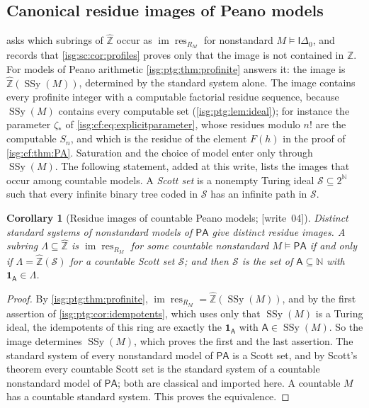 \documentclass[11pt]{article}
\newtheorem{corollary}[corollary]{Corollary}
\theoremstyle{definition}
\theoremstyle{remark}
\newcommand{\Z}{\mathbb{Z}}
\newcommand{\N}{\mathbb{N}}
\newcommand{\Zhat}{\widehat{\Z}}
\newcommand{\res}{\operatorname{res}}
\newcommand{\Idelta}{\mathsf{I}\Delta_0}
\newcommand{\im}{\operatorname{im}}
\newcommand{\PA}{\mathsf{PA}}
\newcommand{\SSy}{\operatorname{SSy}}
\begin{document}
\subsection{Canonical residue images of Peano models}\label{isg:ptg:sec:images}
 asks which subrings of $\Zhat$ occur as
$\im\res_{R_M}$ for nonstandard $M\models\Idelta$, and records that
\cref{isg:sc:cor:profiles} proves only that the image is not contained in
$\Z$. For models of Peano arithmetic \cref{isg:ptg:thm:profinite} answers
it: the image is $\Zhat(\SSy(M))$, determined by the standard system alone.
The image contains every profinite integer with a computable factorial
residue sequence, because $\SSy(M)$ contains every computable set
(\cref{isg:ptg:lem:ideal}); for instance the parameter $\zeta_*$ of
\eqref{isg:cf:eq:explicitparameter}, whose residues modulo $n!$ are the
computable $S_n$, and which is the residue of the element $F(h)$ in the
proof of \cref{isg:cf:thm:PA}. Saturation
and the choice of model enter only through $\SSy(M)$. The following
statement, added at this write, lists the images that occur among countable
models. A \emph{Scott set} is a nonempty Turing ideal
$\mathcal S\subseteq2^\N$ such that every infinite binary tree coded in
$\mathcal S$ has an infinite path in $\mathcal S$.

\begin{corollary}[Residue images of countable Peano models; \textup{[write~04]}]\label{isg:ptg:cor:images}
Distinct standard systems of nonstandard models of $\PA$ give distinct
residue images. A subring $\Lambda\subseteq\Zhat$ is $\im\res_{R_M}$ for
some countable nonstandard $M\models\PA$ if and only if
$\Lambda=\Zhat(\mathcal S)$ for a countable Scott set $\mathcal S$; and then
$\mathcal S$ is the set of $\mathsf A\subseteq\N$ with
$\mathbf 1_{\mathsf A}\in\Lambda$.
\end{corollary}
\begin{proof}
By \cref{isg:ptg:thm:profinite}, $\im\res_{R_M}=\Zhat(\SSy(M))$, and by
the first assertion of \cref{isg:ptg:cor:idempotents}, which uses only that
$\SSy(M)$ is a Turing ideal, the idempotents of this ring are exactly the
$\mathbf 1_{\mathsf A}$ with $\mathsf A\in\SSy(M)$. So the image determines
$\SSy(M)$, which proves the first and the last assertion. The standard
system of every nonstandard model of $\PA$ is a Scott set, and by Scott's
theorem \cite{Scott} every countable Scott set is the standard system of a
countable nonstandard model of $\PA$; both are classical and imported here.
A countable $M$ has a countable standard system. This proves the
equivalence.
\end{proof}
\end{document}
